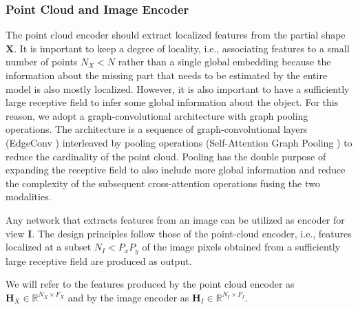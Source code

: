 \documentclass{article}
\newcommand{\Hb}{\mathbf{H}}
\newcommand{\Xb}{\mathbf{X}}
\newcommand{\Ib}{\mathbf{I}}
\begin{document}
\subsubsection{Point Cloud and Image Encoder}
The point cloud encoder should extract localized features from the partial shape $\Xb$. It is important to keep a degree of locality, i.e., associating features to a small number of points $N_X < N$ rather than a single global embedding because the information about the missing part that needs to be estimated by the entire model is also mostly localized. However, it is also important to have a sufficiently large receptive field to infer some global information about the object. For this reason, we adopt a graph-convolutional architecture with graph pooling operations. The architecture is a sequence of graph-convolutional layers (EdgeConv \cite{dgcnn}) interleaved by pooling operations (Self-Attention Graph Pooling \cite{sag-pool}) to reduce the cardinality of the point cloud. Pooling has the double purpose of expanding the receptive field to also include more global information and reduce the complexity of the subsequent cross-attention operations fusing the two modalities.  


Any network that extracts features from an image can be utilized as encoder for view $\Ib$. The design principles follow those of the point-cloud encoder, i.e., features localized at a subset $N_I < P_xP_y$ of the image pixels obtained from a sufficiently large receptive field are produced as output.

We will refer to the features produced by the point cloud encoder as $\Hb_X \in \mathbb{R}^{N_X \times F_X}$ and by the image encoder as $\Hb_I \in \mathbb{R}^{N_I \times F_I}$.
\end{document}
